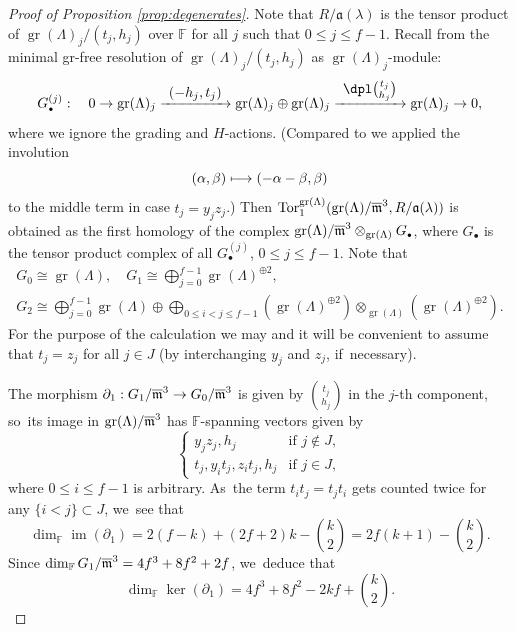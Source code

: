 \documentclass[JEP,XML,SOM,Unicode,NoFloatCountersInSection, NoEqCountersInSection,published]{cedram}
\newcommand\mto{\mathchoice{\longmapsto}{\mapsto}{\mapsto}{\mapsto}}
\newcommand{\To}[1]{\mathchoice{\xrightarrow{\textstyle\kern4pt#1\kern3pt}}{\stackrel{#1}{\longrightarrow}}{}{}}
\newcommand{\sbullet}{{\scriptscriptstyle\bullet}}
\let\ovl\overline
\newcommand{\F}{\mathbb{F}}
\DeclareMathOperator{\gr}{gr}
\DeclareMathOperator{\im}{im}
\DeclareMathOperator{\Tor}{Tor}
\theoremstyle{plain}
\theoremstyle{definition}
\begin{document}
\begin{proof}[Proof of Proposition \ref{prop:degenerates}]
Note that $R/\mathfrak{a}(\lambda)$ is the tensor product of $\gr(\Lambda)_j/(t_j,h_j)$ over $\F$ for all $j$ such that $0 \le j \le f-1$.
Recall from \cite[Lem.\,9.6]{HuWang2} the minimal gr-free resolution of $\gr(\Lambda)_j/(t_j,h_j)$ as $\gr(\Lambda)_j$-module:\vspace*{-8pt}
\begin{equation*}
G_\sbullet^{(j)}: \quad 0 \to \gr(\Lambda)_j \To{(-h_j,t_j)} \gr(\Lambda)_j \oplus \gr(\Lambda)_j \To{\dpl\binom{t_j}{h_j}} \gr(\Lambda)_j \to 0,
\end{equation*}
where we ignore the grading and $H$-actions.
(Compared to \cite[Lem.\,9.6]{HuWang2} we applied the involution
\[
(\alpha,\beta) \mto (-\alpha-\beta,\beta)
\]
to the middle term in case $t_j = y_jz_j$.)
Then $\Tor_1^{\gr(\Lambda)}(\gr(\Lambda)/\ovl\m^3,R/\mathfrak{a}(\lambda))$ is obtained as the first homology of the complex
$\gr(\Lambda)/\ovl\m^3 \otimes_{\gr(\Lambda)} G_\sbullet$, where $G_\sbullet$ is the tensor product complex of all $G_\sbullet^{(j)}$, $0 \le j \le f-1$.
Note that
\begin{gather*}
G_0 \cong \gr(\Lambda),\quad G_1 \cong \bigoplus_{j=0}^{f-1} \gr(\Lambda)^{\oplus 2},\\
G_2 \cong \bigoplus_{j=0}^{f-1} \gr(\Lambda) \oplus \bigoplus_{0 \le i < j \le f-1} (\gr(\Lambda)^{\oplus 2}) \otimes_{\gr(\Lambda)} (\gr(\Lambda)^{\oplus 2}).
\end{gather*}
For the purpose of the calculation we may and it will be convenient to assume that $t_j = z_j$ for all $j \in J$ (by interchanging $y_j$ and $z_j$, if~necessary).

The morphism $\partial_1: G_1/\ovl\m^3 \to G_0/\ovl\m^3$ is given by $\binom{t_j}{h_j}$ in the $j$-th component, so~its image in $\gr(\Lambda)/\ovl\m^3$ has $\F$-spanning vectors given by
\begin{equation*}
\begin{cases}
y_jz_j, h_j & \text{if $j \notin J$},\\
t_j, y_i t_j, z_i t_j, h_j & \text{if $j \in J$},
\end{cases}
\end{equation*}
where $0 \le i \le f-1$ is arbitrary. As~the term $t_i t_j = t_j t_i$ gets counted twice for any $\{i < j\} \subset J$, we~see that
\begin{equation*}
\dim_\F \im(\partial_1) = 2(f-k)+(2f+2)k-\binom k2 = 2f(k+1)-\binom k2.
\end{equation*}
Since $\dim_\F G_1/\ovl\m^3 = 4f^3+8f^2+2f$, we~deduce that
\begin{equation*}
\dim_\F \ker(\partial_1) = 4f^3+8f^2-2kf+\binom k2.
\end{equation*}


\end{proof}
\end{document}
